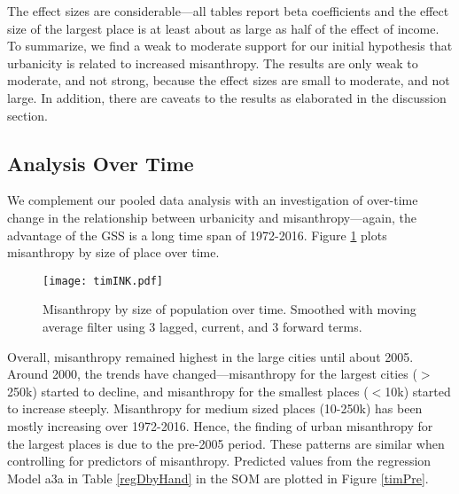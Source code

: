\documentclass[11pt, letterpaper]{article}
\begin{document}
\begin{spacing}{1.4}


The effect sizes are considerable---all tables report beta coefficients
and the effect size of the largest place is at least about as large as half of the effect
of income.  To summarize, we find a weak to moderate support for our initial
hypothesis that urbanicity is related to increased misanthropy. The results are
only weak to moderate, and not strong, because the effect sizes are small to
moderate, and not large. In addition, there are caveats to the results as elaborated in the discussion section.

\subsection*{Analysis Over Time}

We complement our pooled data analysis with an investigation of over-time change
in the relationship between urbanicity and misanthropy---again, the advantage of the GSS
is a long time span of 1972-2016. Figure \ref{tim} plots misanthropy by size of
place over time.

\begin{figure}[H]
  \texttt{[image: timINK.pdf]}\centering
\caption{Misanthropy by size of population over time. Smoothed with moving average filter using 3 lagged, current, and 3 forward terms.}\label{tim}%
\end{figure}

Overall, misanthropy remained highest in the large cities until
about 2005. Around 2000, the trends have changed---misanthropy for the largest
cities ($>$250k) started to decline, and misanthropy for the smallest places
($<$10k) started to increase steeply. Misanthropy for medium
sized places (10-250k) has been mostly increasing over 1972-2016. Hence, the
finding of urban misanthropy for the largest places is due to the pre-2005 period.
%
These patterns are similar when controlling for predictors of
misanthropy. Predicted values from the regression Model a3a in Table \ref{regDbyHand} in
the SOM are plotted in Figure \ref{timPre}. 



\end{spacing}
\end{document}
